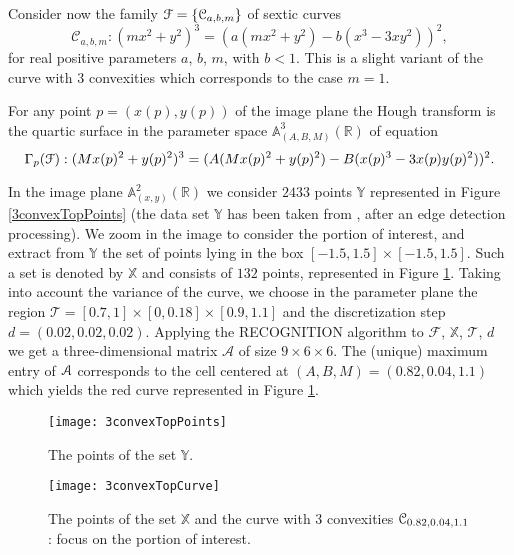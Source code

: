 \documentclass[10pt]{article}
\newcommand\sA{{\cal A}}
\newcommand\sC{{\cal C}}
\newcommand\sF{{\cal F}}
\newcommand\reals{{\mathbb R}}
\newtheorem{examp}[theorem]{Example}
\newenvironment{example*}{\begin{examp}\em}{\end{examp}}
\begin{document}
{\begin{example*}
Consider now the family $\sF=\{\mathcal{C}_{a,b,m}\}$ 
of sextic curves
  \begin{equation*}\label{diludendo}
\mathcal{C}_{a,b,m}: (mx^2+y^2)^3 = (a(mx^2+y^2) - b(x^3-3xy^2))^2,
\end{equation*}
 for  real positive parameters $a$, $b$,  $m$, with $b<1$. 
 This is a slight variant of  the curve with $3$ convexities
 which corresponds to the case $m=1$. 
 
 For any point $p=(x(p), y(p))$ of the image plane the Hough transform is the  
quartic  surface  in the parameter space ${\mathbb A}_{(A,B,M)}^3(\reals)$ of equation
$$
\Gamma_p(\sF): (Mx(p)^2+y(p)^2)^3 = (A(Mx(p)^2+y(p)^2) - B(x(p)^3-3x(p)y(p)^2))^2.
$$


In the image plane ${\mathbb A}_{(x,y)}^2(\reals)$  we consider  $2433$ points  $\mathbb Y$ represented in Figure \ref{3convexTopPoints}  
(the data set  $\mathbb Y$ has  been taken from \cite[Figure 4, Top case]{etal}, after an edge detection processing). 
We zoom in the image to consider the portion
of interest, and extract from $\mathbb Y$  the set of points lying in the box $[-1.5,1.5] \times [-1.5,1.5]$.
Such a set is denoted by $\mathbb X$ and consists of $132$ points,
represented in Figure \ref{3convexTopCurve}.
Taking into account the variance of the curve, we choose in the parameter plane 
the region $\mathcal T =[0.7,1] \times [0,  0.18] \times [0.9,1.1] $
and the discretization step $d=(0.02, 0.02, 0.02)$.
Applying the RECOGNITION algorithm to 
$\mathcal F$, $\mathbb X$, $\mathcal T$, $d$ we get  a  three-dimensional
matrix $\mathcal A$ of size $9 \times 6 \times 6$.
The (unique) maximum entry of $\sA$  
corresponds to the cell centered at $(A,B,M) = (0.82, 0.04, 1.1)$
which yields the red curve represented in Figure \ref{3convexTopCurve}.

\begin{figure}[htb]
\centering
\begin{minipage}[c]{0.50\textwidth}
\texttt{[image: 3convexTopPoints]}
\caption{\small{The points of the set $\mathbb Y$.}}
\label{3convexTopPoints}
\end{minipage}%
\hspace{0.29cm}
\begin{minipage}[c]{0.47\textwidth}
\texttt{[image: 3convexTopCurve]}
\caption{\small{The points of the set $\mathbb X$ and the curve with $3$ convexities
$\sC_{0.82, 0.04, 1.1}$: focus on the portion of interest.}}\label{3convexTopCurve}
\end{minipage}
\end{figure}
\end{example*}


}
\end{document}
